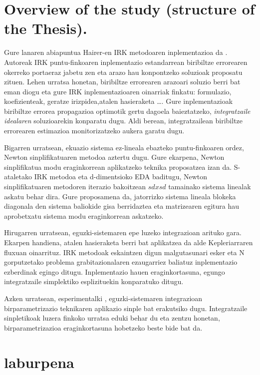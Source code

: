 \section{Overview of the study (structure of the Thesis).}

Gure lanaren abiapuntua Hairer-en IRK metodoaren inplementazioa da \cite{Hairer2008}. Autoreak IRK puntu-finkoaren inplementazio estandarrean biribiltze errorearen okerreko portaeraz jabetu zen eta arazo hau konpontzeko soluzioak proposatu zituen. Lehen urratsa honetan, biribiltze errorearen arazoari soluzio berri bat eman diogu eta gure IRK inplementazioaren oinarriak finkatu: formulazio, koefizienteak, geratze irizpidea,atalen hasieraketa \dots.
Gure inplementazioak biribiltze errorea propagazioa optimotik gertu dagoela baieztatzeko, \textit {integratzaile idealaren} soluzioarekin konparatu dugu. Aldi berean, integratzailean biribiltze errorearen estimazioa monitorizatzeko aukera garatu dugu.

Bigarren urratsean, ekuazio sistema ez-lineala ebazteko puntu-finkoaren ordez, Newton sinplifikatuaren metodoa aztertu dugu. Gure ekarpena, Newton sinplifikatua modu eraginkorrean aplikatzeko teknika proposatzea izan da. S-ataletako IRK metodoa eta d-dimentsioko EDA baditugu, Newton sinplifikatuaren metodoren iterazio bakoitzean $sdxsd$ tamainako sistema linealak askatu behar dira. Gure proposamena da, jatorrizko sistema lineala blokeka diagonala den sistema baliokide gisa berridaztea eta matrizearen egitura hau aprobetxatu sistema modu eraginkorrean askatzeko.

Hirugarren urratsean, eguzki-sistemaren epe luzeko integrazioan arituko gara. Ekarpen handiena, atalen hasieraketa berri bat aplikatzea da alde Kepleriarraren fluxuan oinarrituz. IRK metodoak eskaintzen digun malgutasunari esker eta N gorputzetako problema grabitazionalaren ezaugarriez baliatuz inplementazio ezberdinak egingo ditugu. Inplementazio hauen eraginkortasuna, egungo integratzaile simplektiko esplizituekin konparatuko ditugu.

Azken urratsean, esperimentalki , eguzki-sistemaren integrazioan  birparametrizazio teknikaren aplikazio sinple bat erakutsiko dugu. Integratzaile sinpletikoak luzera finkoko urratsa eduki behar du eta zentzu honetan, birparametrizazioa eraginkortasuna hobetzeko beste bide bat da.             
      
\section{laburpena}

